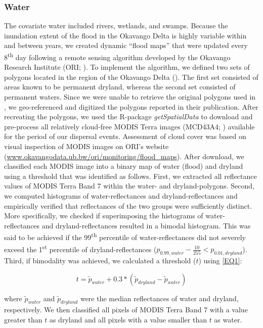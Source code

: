 \documentclass[abstract=off,10pt,a4paper,bibliography=totocnumbered]{article}
\begin{document}
\subsubsection{Water}
The covariate water included rivers, wetlands, and swamps. Because the
inundation extent of the flood in the Okavango Delta is highly variable within
and between years, we created dynamic ``flood maps'' that were updated every
8\textsuperscript{th} day following a remote sensing algorithm developed by the
Okavango Research Institute (ORI; \citealp{Wolski.2017}). To implement the
algorithm, we defined two sets of polygons located in the region of the Okavango
Delta (). The first set consisted of areas known to be
permanent dryland, whereas the second set consisted of permanent waters. Since
we were unable to retrieve the original polygons used in \cite{Wolski.2017}, we
geo-referenced and digitized the polygons reported in their publication. After
recreating the polygons, we used the R-package \textit{getSpatialData}
\citep{Schwalb.2018} to download and pre-process all relatively cloud-free MODIS
Terra images (MCD43A4; \citealp{Schaaf.2015}) available for the period of our
dispersal events. Assessment of cloud cover was based on visual inspection of
MODIS images on ORI's website
(\url{www.okavangodata.ub.bw/ori/monitoring/flood_maps}). After download, we
classified each MODIS image into a binary map of water (flood) and dryland using
a threshold that was identified as follows. First, we extracted all reflectance
values of MODIS Terra Band 7 within the water- and dryland-polygons. Second, we
computed histograms of water-reflectances and dryland-reflectances and
empirically verified that reflectances of the two groups were sufficiently
distinct. More specifically, we checked if superimposing the histograms of
water-reflectances and dryland-reflectances resulted in a bimodal histogram.
This was said to be achieved if the 99\textsuperscript{th} percentile of
water-reflectances did not severely exceed the 1\textsuperscript{st} percentile
of dryland-reflectances (\(p_{0.99, water} - \frac{10}{255} < p_{0.01,
dryland}\)). Third, if bimodality was achieved, we calculated a threshold
(\(t\)) using \ref{EQ1}:

\begin{equation}
\label{EQ1}
t = \widetilde{p}_{water} + 0.3 * (\widetilde{p}_{dryland} -
\widetilde{p}_{water})
\end{equation}

\noindent where \(\widetilde{p}_{water}\) and \(\widetilde{p}_{dryland}\) were
the median reflectances of water and dryland, respectively. We then classified
all pixels of MODIS Terra Band 7 with a value greater than \(t\) as dryland and
all pixels with a value smaller than \(t\) as water.
\end{document}
